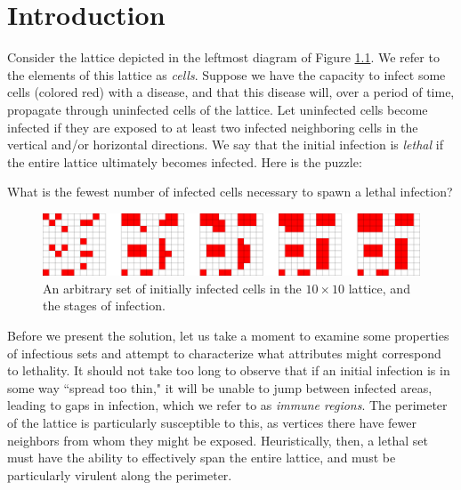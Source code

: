 \chapter{Introduction}

Consider the lattice depicted in the leftmost diagram of Figure \ref{fig:simple_puzzle}. We refer to the elements of this lattice as \emph{cells}. Suppose we have the capacity to infect some cells (colored red) with a disease, and that this disease will, over a period of time, propagate through uninfected cells of the lattice. Let uninfected cells become infected if they are exposed to at least two infected neighboring cells in the vertical and/or horizontal directions. We say that the initial infection is \emph{lethal} if the entire lattice ultimately becomes infected. Here is the puzzle:

\begin{question}
\label{que:simple_puzzle}
What is the fewest number of infected cells necessary to spawn a lethal infection?
\end{question}

\begin{figure}[]
\centering
\includegraphics[width=\textwidth]{figures/1/simple_puzzle.pdf}
\caption{An arbitrary set of initially infected cells in the $10 \times 10$ lattice, and the stages of infection.}
\label{fig:simple_puzzle}
\end{figure} 

Before we present the solution,
let us take a moment to examine some properties of infectious sets and attempt to characterize what attributes might correspond to lethality. It should not take too long to observe that if an initial infection is in some way ``spread too thin," it will be unable to jump between infected areas, leading to gaps in infection, which we refer to as \emph{immune regions}. The perimeter of the lattice is particularly susceptible to this, as vertices there have fewer neighbors from whom they might be exposed. Heuristically, then, a lethal set must have the ability to effectively span the entire lattice, and must be particularly virulent along the perimeter. 

